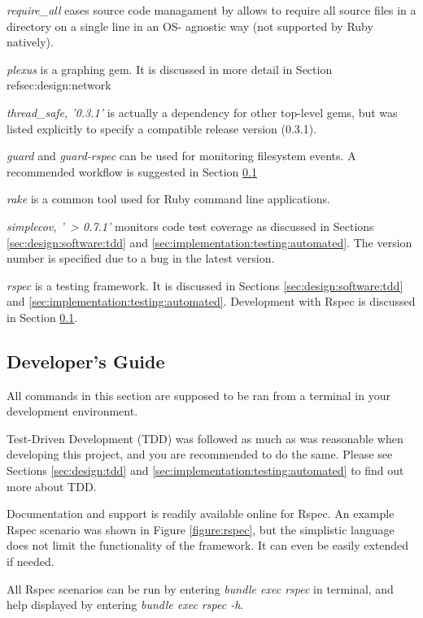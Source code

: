 \textit{require\_all} \parencite{Require+all} eases source code managament by
allows to require all source files in a directory on a single line in an OS-
agnostic way (not supported by Ruby natively).

\textit{plexus} \parencite{Plexus} is a graphing gem. It is discussed in more
detail in Section ref{sec:design:network}

\textit{thread\_safe, '0.3.1'} is actually a dependency for other top-level
gems, but was listed explicitly to specify a compatible release version
(0.3.1).

\textit{guard} and \textit{guard-rspec} \parencite{Guard} can be used for
monitoring filesystem events. A recommended workflow is suggested in Section
\ref{sec:maintenance_manual:testing}

\textit{rake} \parencite{Rake} is a common tool used for Ruby command line
applications.

\textit{simplecov, '~> 0.7.1'} \parencite{Simplecov} monitors code test
coverage as discussed in Sections \ref{sec:design:software:tdd} and
\ref{sec:implementation:testing:automated}. The version number is specified due
to a bug in the latest version.

\textit{rspec} \parencite{Rspec} is a testing framework. It is discussed in
Sections \ref{sec:design:software:tdd} and
\ref{sec:implementation:testing:automated}. Development with Rspec is discussed
in Section \ref{sec:maintenance_manual:testing}.


\subsection{Developer's Guide}
\label{sec:maintenance_manual:testing}

All commands in this section are supposed to be ran from a terminal in your
development environment.

Test-Driven Development (TDD) was followed as much as was reasonable when
developing this project, and you are recommended to do the same. Please see
Sections \ref{sec:design:tdd} and \ref{sec:implementation:testing:automated} to
find out more about TDD.

Documentation and support is readily available online for Rspec. An example
Rspec scenario was shown in Figure \ref{figure:rspec}, but the simplistic
language does not limit the functionality of the framework. It can even be
easily extended if needed.

All Rspec scenarios can be run by entering \textit{bundle exec rspec} in
terminal, and help displayed by entering \textit{bundle exec rspec -h}.

